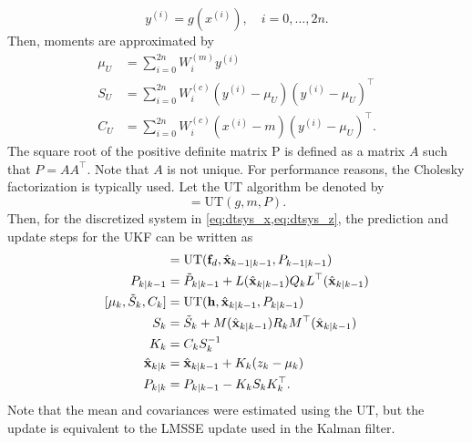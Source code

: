 \documentclass[../zhang_thesis.tex]{subfiles}
\begin{document}
\begin{equation}
    y^{(i)} = g(x^{(i)}), \quad i=0,\dots,2n. \label{eq:ut3}
\end{equation}
Then, moments are approximated by
\begin{align}
    \mu_U & = \sum_{i=0}^{2n} W_i^{(m)} y^{(i)} \\
    S_U & = \sum_{i=0}^{2n} W_i^{(c)} ( y^{(i)} - \mu_U ) ( y^{(i)} - \mu_U )^\top \\
    C_U & = \sum_{i=0}^{2n} W_i^{(c)} ( x^{(i)} - m ) ( y^{(i)} - \mu_U )^\top. \label{eq:ut4}
\end{align}
The square root of the positive definite matrix P is defined as a matrix $A$ such that $P=AA^\top$. Note that $A$ is not unique. For performance reasons, the Cholesky factorization is typically used. Let the UT algorithm be denoted by
\begin{equation}
    [\mu_U,S_U,C_U] = \mathrm{UT}(g,m,P).
\end{equation}
Then, for the discretized system in \cref{eq:dtsys_x,eq:dtsys_z}, the prediction and update steps for the UKF can be written as
\begin{align}
	[\hat{\vx}_{k|k-1},\tilde{P}_{k|k-1}] & = \mathrm{UT}(\vf_d,\hat{\vx}_{k-1|k-1},P_{k-1|k-1}) \label{eq:ukfp1} \\
	P_{k|k-1} & = \tilde{P}_{k|k-1} + L(\hat{\vx}_{k|k-1}) Q_k L^\top(\hat{\vx}_{k|k-1})\\
	[\mu_k,\tilde{S}_k,C_k] & = \mathrm{UT}(\mathbf{h},\hat{\vx}_{k|k-1},P_{k|k-1}) \label{eq:ukfu1} \\
    S_k & = \tilde{S}_k + M(\hat{\vx}_{k|k-1}) R_k M^\top(\hat{\vx}_{k|k-1}) \\
    K_k & = C_k S_k^{-1} \\
    \hat{\vx}_{k|k} & = \hat{\vx}_{k|k-1}+ K_k (z_k-\mu_k) \\
	P_{k|k} & = P_{k|k-1}- K_k S_k K_k^\top. \label{eq:ukful}
\end{align}
Note that the mean and covariances were estimated using the UT, but the update is equivalent to the LMSSE update used in the Kalman filter.
\end{document}

